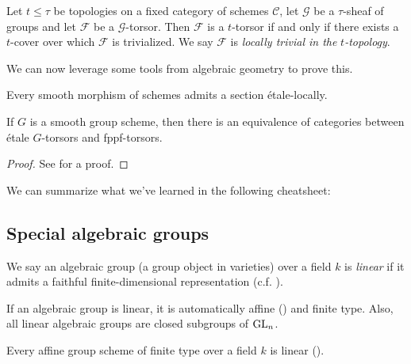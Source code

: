 \documentclass[11pt,openany]{book}
\begin{document}
\begin{definition} Let $t\le \tau$ be topologies on a fixed category of schemes $\mathscr{C}$, let $\mathcal{G}$ be a $\tau$-sheaf of groups and let $\mathcal{F}$ be a $\mathcal{G}$-torsor. Then $\mathcal{F}$ is a $t$-torsor if and only if there exists a $t$-cover over which $\mathcal{F}$ is trivialized. We say $\mathcal{F}$ is \textit{locally trivial in the} $t$\textit{-topology}.
\end{definition}

We can now leverage some tools from algebraic geometry to prove this.

\begin{proposition} Every smooth morphism of schemes admits a section \'etale-locally.
\end{proposition}

\begin{corollary} If $G$ is a smooth group scheme, then there is an equivalence of categories between \'etale $G$-torsors and fppf-torsors.
\end{corollary}
\begin{proof} See \cite[Proposition~4]{chd} for a proof.
\end{proof}

We can summarize what we've learned in the following cheatsheet:





\subsection{Special algebraic groups}


\begin{definition} We say an algebraic group (a group object in varieties) over a field $k$ is \textit{linear} if it admits a faithful finite-dimensional representation (c.f. \cite[p.~72]{MilneAG}).
\end{definition}

\begin{note} If an algebraic group is linear, it is automatically affine (\cite[1.29]{MilneAG}) and finite type. Also, all linear algebraic groups are closed subgroups of $\mathrm{GL}_n$.
\end{note}


\begin{proposition} Every affine group scheme of finite type over a field $k$ is linear (\cite[4.8]{MilneAG}).
\end{proposition}
\end{document}
